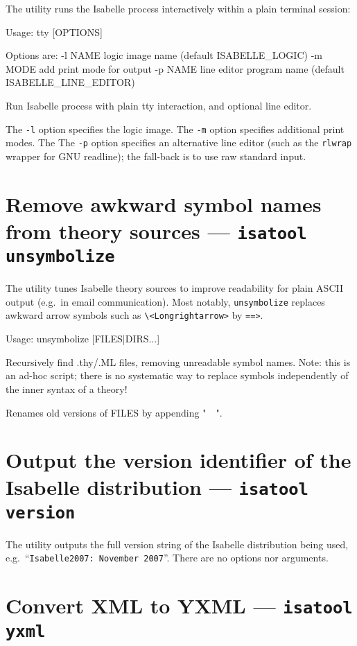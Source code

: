The  utility runs the Isabelle process interactively
within a plain terminal session:
\begin{ttbox}
Usage: tty [OPTIONS]

  Options are:
    -l NAME      logic image name (default ISABELLE_LOGIC)
    -m MODE      add print mode for output
    -p NAME      line editor program name (default ISABELLE_LINE_EDITOR)

  Run Isabelle process with plain tty interaction, and optional line editor.
\end{ttbox}

The \texttt{-l} option specifies the logic image.  The \texttt{-m}
option specifies additional print modes.  The The \texttt{-p} option
specifies an alternative line editor (such as the \texttt{rlwrap}
wrapper for GNU readline); the fall-back is to use raw standard input.


\section{Remove awkward symbol names from theory sources --- \texttt{isatool unsymbolize}}

The  utility tunes Isabelle theory sources to improve
readability for plain ASCII output (e.g.\ in email communication).  Most
notably, \texttt{unsymbolize} replaces awkward arrow symbols such as
\verb|\<Longrightarrow>| by \verb|==>|.
\begin{ttbox}
Usage: unsymbolize [FILES|DIRS...]

  Recursively find .thy/.ML files, removing unreadable symbol names.
  Note: this is an ad-hoc script; there is no systematic way to replace
  symbols independently of the inner syntax of a theory!

  Renames old versions of FILES by appending "~~".
\end{ttbox}


\section{Output the version identifier of the Isabelle distribution --- \texttt{isatool version}}

The  utility outputs the full version string of the
Isabelle distribution being used, e.g.\ ``\texttt{Isabelle2007:
  November 2007}''.  There are no options nor arguments.


\section{Convert XML to YXML --- \texttt{isatool yxml}}

